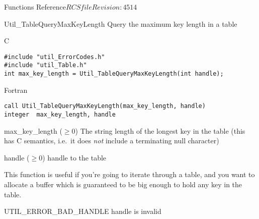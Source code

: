 \begin{cactuspart}{ Functions Reference}{$RCSfile$}{$Revision: 4514 $}

\begin{FunctionDescription}{Util\_TableQueryMaxKeyLength}
\label{Util-TableQueryMaxKeyLength}
Query the maximum key length in a table

\begin{SynopsisSection}
\begin{Synopsis}{C}
\begin{verbatim}
#include "util_ErrorCodes.h"
#include "util_Table.h"
int max_key_length = Util_TableQueryMaxKeyLength(int handle);
\end{verbatim}
\end{Synopsis}
\begin{Synopsis}{Fortran}
\begin{verbatim}
call Util_TableQueryMaxKeyLength(max_key_length, handle)
integer  max_key_length, handle
\end{verbatim}
\end{Synopsis}
\end{SynopsisSection}

\begin{ResultSection}
\begin{Result}{max\_key\_length ($\ge 0$)}
The string length of the longest key in the table
(this has C  semantics, i.e.\ it does {\em not\/}
include a terminating null character)
\end{Result}
\end{ResultSection}

\begin{ParameterSection}
\begin{Parameter}{handle ($\ge 0$)}
handle to the table
\end{Parameter}
\end{ParameterSection}

\begin{Discussion}
This function is useful if you're going to iterate through a table,
and you want to allocate a buffer which is guaranteed to be big enough
to hold any key in the table.
\end{Discussion}

\begin{ErrorSection}
\begin{Error}{UTIL\_ERROR\_BAD\_HANDLE}
handle is invalid
\end{Error}
\end{ErrorSection}


\end{FunctionDescription}
\end{cactuspart}
